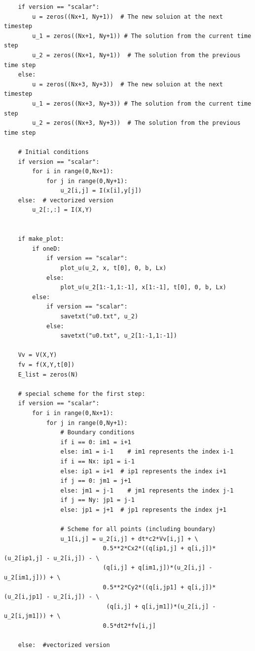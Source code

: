 \documentclass[twoside]{article}
\begin{document}
\begin{verbatim}
    if version == "scalar":
        u = zeros((Nx+1, Ny+1))  # The new soluion at the next timestep
        u_1 = zeros((Nx+1, Ny+1)) # The solution from the current time step
        u_2 = zeros((Nx+1, Ny+1))  # The solution from the previous time step
    else:
        u = zeros((Nx+3, Ny+3))  # The new soluion at the next timestep
        u_1 = zeros((Nx+3, Ny+3)) # The solution from the current time step
        u_2 = zeros((Nx+3, Ny+3))  # The solution from the previous time step
    
    # Initial conditions
    if version == "scalar":
        for i in range(0,Nx+1):
            for j in range(0,Ny+1):
                u_2[i,j] = I(x[i],y[j])
    else:  # vectorized version
        u_2[:,:] = I(X,Y)
    
    
    if make_plot:
        if oneD:
            if version == "scalar":
                plot_u(u_2, x, t[0], 0, b, Lx)
            else:
                plot_u(u_2[1:-1,1:-1], x[1:-1], t[0], 0, b, Lx)
        else:
            if version == "scalar":
                savetxt("u0.txt", u_2)
            else:
                savetxt("u0.txt", u_2[1:-1,1:-1])
   
    Vv = V(X,Y)
    fv = f(X,Y,t[0])
    E_list = zeros(N)

    # special scheme for the first step:
    if version == "scalar":
        for i in range(0,Nx+1):
            for j in range(0,Ny+1):
                # Boundary conditions
                if i == 0: im1 = i+1
                else: im1 = i-1    # im1 represents the index i-1
                if i == Nx: ip1 = i-1
                else: ip1 = i+1  # ip1 represents the index i+1
                if j == 0: jm1 = j+1
                else: jm1 = j-1    # jm1 represents the index j-1
                if j == Ny: jp1 = j-1
                else: jp1 = j+1  # jp1 represents the index j+1
                
                # Scheme for all points (including boundary)
                u_1[i,j] = u_2[i,j] + dt*c2*Vv[i,j] + \
                            0.5**2*Cx2*((q[ip1,j] + q[i,j])*(u_2[ip1,j] - u_2[i,j]) - \
                            (q[i,j] + q[im1,j])*(u_2[i,j] - u_2[im1,j])) + \
                            0.5**2*Cy2*((q[i,jp1] + q[i,j])*(u_2[i,jp1] - u_2[i,j]) - \
                             (q[i,j] + q[i,jm1])*(u_2[i,j] - u_2[i,jm1])) + \
                            0.5*dt2*fv[i,j]
                                                    
    else:  #vectorized version
        

\end{verbatim}
\end{document}
